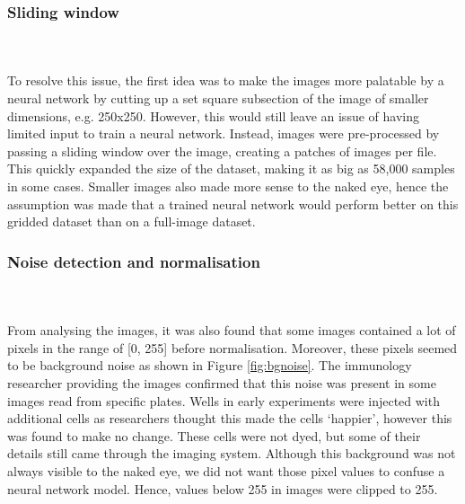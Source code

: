 \bigskip
\subsubsection{Sliding window}

\hfill\\
\hfill\\
To resolve this issue, the first idea was to make the images more palatable by a neural network by cutting up a set square subsection of the image of smaller dimensions, e.g. 250x250. However, this would still leave an issue of having limited input to train a neural network. Instead, images were pre-processed by passing a sliding window over the image, creating a patches of images per file. This quickly expanded the size of the dataset, making it as big as 58,000 samples in some cases. Smaller images also made more sense to the naked eye, hence the assumption was made that a trained neural network would perform better on this gridded dataset than on a full-image dataset.

\bigskip
\subsubsection{Noise detection and normalisation}

\hfill\\
\hfill\\
From analysing the images, it was also found that some images contained a lot of pixels in the range of [0, 255] before normalisation. Moreover, these pixels seemed to be background noise as shown in Figure \ref{fig:bgnoise}. The immunology researcher providing the images confirmed that this noise was present in some images read from specific plates. Wells in early experiments were injected with additional cells as researchers thought this made the cells `happier', however this was found to make no change. These cells were not dyed, but some of their details still came through the imaging system. Although this background was not always visible to the naked eye, we did not want those pixel values to confuse a neural network model. Hence, values below 255 in images were clipped to 255.


